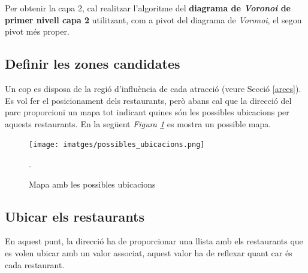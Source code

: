 \documentclass[12pt]{article}
\begin{document}
Per obtenir la capa 2, cal realitzar l'algoritme del \textbf{diagrama de \textit{Voronoi} de primer nivell capa 2} utilitzant, com a pivot del diagrama de \textit{Voronoi}, el segon pivot més proper.





\subsection{Definir les zones candidates}
Un cop es disposa de la regió d'influència de cada atracció (veure Secció \ref{arees}). Es vol fer el posicionament dels restaurants, però abans cal que la direcció del parc proporcioni un mapa tot indicant quines són les possibles ubicacions per aquests restaurants. En la següent \textit{Figura \ref{fig:zones_candidates}} es mostra un possible mapa.

\begin{figure}[H]
	\centering
	\texttt{[image: imatges/possibles\_ubicacions.png]}\par\vspace{1cm}
	\caption{Mapa amb les possibles ubicacions}.
	\label{fig:zones_candidates}
\end{figure}

\subsection{Ubicar els restaurants}
En aquest punt, la direcció ha de proporcionar una llista amb els restaurants que es volen ubicar amb un valor associat, aquest valor ha de reflexar quant car és cada restaurant.
\end{document}
